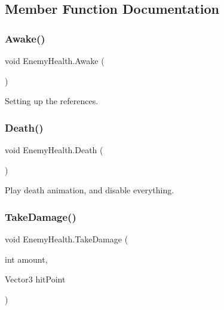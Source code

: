 \subsection{Member Function Documentation}
\mbox{\label{class_enemy_health_a39b183a0c0642fdb1d1e56b63ed77d41}} 
\subsubsection{\texorpdfstring{Awake()}{Awake()}}
{\footnotesize\ttfamily void Enemy\+Health.\+Awake (\begin{DoxyParamCaption}{ }\end{DoxyParamCaption})\hspace{0.3cm}{\ttfamily [private]}}



Setting up the references. 

\mbox{\label{class_enemy_health_a74d777b866036ad554de39776cf46429}} 
\subsubsection{\texorpdfstring{Death()}{Death()}}
{\footnotesize\ttfamily void Enemy\+Health.\+Death (\begin{DoxyParamCaption}{ }\end{DoxyParamCaption})\hspace{0.3cm}{\ttfamily [private]}}



Play death animation, and disable everything. 

\mbox{\label{class_enemy_health_aca32e53aac9208ea39dacf21667b0874}} 
\subsubsection{\texorpdfstring{TakeDamage()}{TakeDamage()}}
{\footnotesize\ttfamily void Enemy\+Health.\+Take\+Damage (\begin{DoxyParamCaption}\item[{int}]{amount,  }\item[{Vector3}]{hit\+Point }\end{DoxyParamCaption})}



